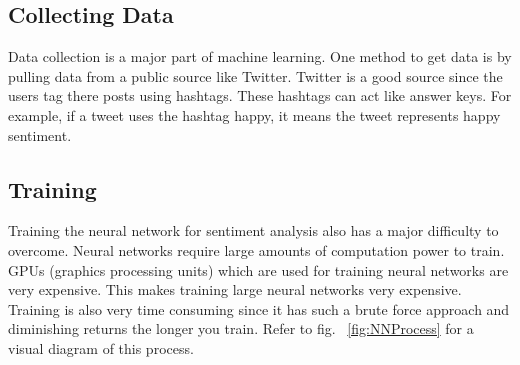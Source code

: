 \documentclass[12pt]{article}
\begin{document}
    \subsection{Collecting Data}
    Data collection is a major part of machine learning. One method to get data is by pulling data from a public source like Twitter. Twitter is a good source since the users tag there posts using hashtags. These hashtags can act like answer keys. For example, if a tweet uses the hashtag happy, it means the tweet represents happy sentiment.

    \subsection{Training}
    Training the neural network for sentiment analysis also has a major difficulty to overcome. Neural networks require large amounts of computation power to train. GPUs (graphics processing units) which are used for training neural networks are very expensive. This makes training large neural networks very expensive. Training is also very time consuming since it has such a brute force approach and diminishing returns the longer you train. Refer to fig. ~\ref{fig:NNProcess} for a visual diagram of this process.
    \printbibliography
\end{document}
